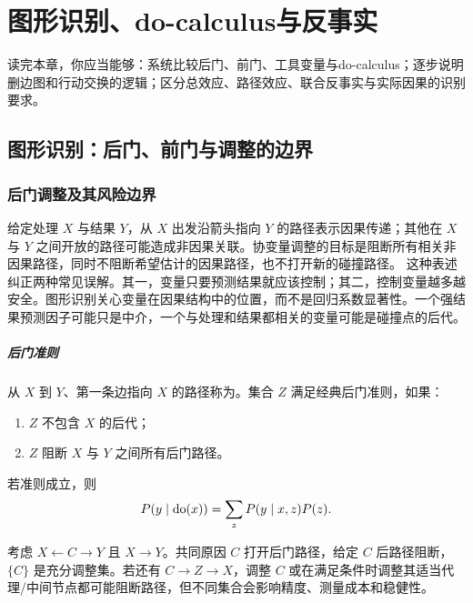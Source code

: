\chapter{图形识别、do-calculus与反事实}
\label{ch:graphical-identification}

\begin{learninggoals}
读完本章，你应当能够：系统比较后门、前门、工具变量与do-calculus；逐步说明删边图和行动交换的逻辑；区分总效应、路径效应、联合反事实与实际因果的识别要求。
\end{learninggoals}

\section{图形识别：后门、前门与调整的边界}

\subsection{后门调整及其风险边界}

给定处理 $X$ 与结果 $Y$，从 $X$ 出发沿箭头指向 $Y$ 的路径表示因果传递；其他在 $X$ 与 $Y$ 之间开放的路径可能造成非因果关联。协变量调整的目标是阻断所有相关非因果路径，同时不阻断希望估计的因果路径，也不打开新的碰撞路径。
这种表述纠正两种常见误解。其一，变量只要预测结果就应该控制；其二，控制变量越多越安全。图形识别关心变量在因果结构中的位置，而不是回归系数显著性。一个强结果预测因子可能只是中介，一个与处理和结果都相关的变量可能是碰撞点的后代。

\paragraph{后门准则}

从 $X$ 到 $Y$、第一条边指向 $X$ 的路径称为。集合 $Z$ 满足经典后门准则，如果：

\begin{enumerate}
  \item $Z$ 不包含 $X$ 的后代；
  \item $Z$ 阻断 $X$ 与 $Y$ 之间所有后门路径。
\end{enumerate}

若准则成立，则
\[
P(y\mid\operatorname{do}(x))=\sum_z P(y\mid x,z)P(z).
\]

考虑 $X\leftarrow C\rightarrow Y$ 且 $X\rightarrow Y$。共同原因 $C$ 打开后门路径，给定 $C$ 后路径阻断，$\{C\}$ 是充分调整集。若还有 $C\rightarrow Z\rightarrow X$，调整 $C$ 或在满足条件时调整其适当代理/中间节点都可能阻断路径，但不同集合会影响精度、测量成本和稳健性。

